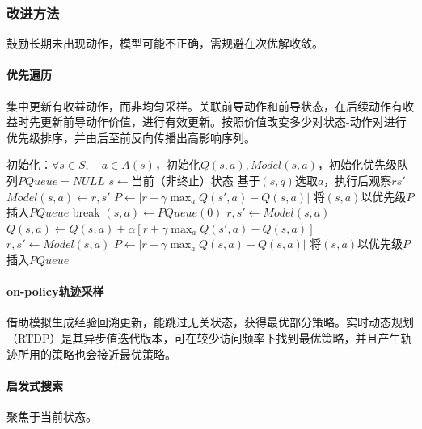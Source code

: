 \documentclass[
12pt, %
a4paper, 
oneside, %
]{scrartcl}
\begin{document}
{\subsubsection[改进方法]{改进方法}
鼓励长期未出现动作，模型可能不正确，需规避在次优解收敛。
\paragraph{优先遍历}
集中更新有收益动作，而非均匀采样。关联前导动作和前导状态，在后续动作有收益时先更新前导动作价值，进行有效更新。按照价值改变多少对状态-动作对进行优先级排序，并由后至前反向传播出高影响序列。
\begin{myalgorithm}[确定性环境下的优先遍历]
\State 初始化：$ \forall s \in S, \quad a \in A(s) $，初始化$ Q(s, a), Model(s, a) $，初始化优先级队列$ PQueue = NULL $
\Loop
\State $ s \gets $当前（非终止）状态
\State 基于$ (s, q) $选取$ a $，执行后观察$ r s' $ 
\State $ Model(s, a) \gets r, s'$
\State $ P \gets |r + \gamma \max_a Q(s', a) - Q(s, a)| $ 
\State 将$ (s, a) $以优先级$ P $插入$ PQueue $
\EndIf
{}
\State break
\EndIf
\State $ (s, a) \gets PQueue(0) $ 
\State $ r, s' \gets Model(s, a) $ 
\State $ Q(s, a) \gets Q(s, a) + \alpha[r + \gamma \max_a Q(s', a) - Q(s, a)] $ 
 
\State $ \bar{r}, \bar{s'} \gets Model(\bar{s}, \bar{a}) $
\State $ P \gets |\bar{r} + \gamma \max_a Q(s, a) - Q(\bar{s}, \bar{a})| $
\State 将$ (\bar{s}, \bar{a}) $以优先级$ P $插入$ PQueue $
\EndIf
\EndIf
\EndFor
\EndFor
\EndLoop
\end{myalgorithm}
\paragraph{on-policy轨迹采样}
借助模拟生成经验回溯更新，能跳过无关状态，获得最优部分策略。实时动态规划（RTDP）是其异步值迭代版本，可在较少访问频率下找到最优策略，并且产生轨迹所用的策略也会接近最优策略。
\paragraph{启发式搜索}
聚焦于当前状态。
}
\end{document}
